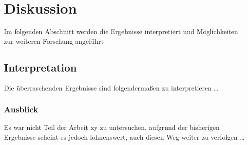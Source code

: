 
\section{Diskussion}

Im folgenden Abschnitt werden die Ergebnisse interpretiert und Möglichkeiten zur weiteren Forschung angeführt

\subsection{Interpretation}
Die überraschenden Ergebnisse sind folgendermaßen zu interpretieren \ldots

\subsubsection{Ausblick}
Es war nicht Teil der Arbeit xy zu untersuchen, aufgrund der bisherigen Ergebnisse scheint es jedoch lohnenswert, auch diesen Weg weiter zu verfolgen \ldots
